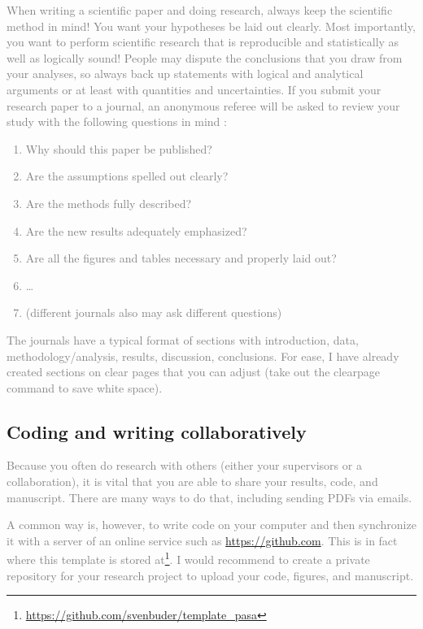 \documentclass[
  journal=pasa,
  manuscript=Research-Article,
  year=2025,
  volume=X,
]{cup-journal}
\newcommand{\comment}[1]{\textcolor{gray}{#1}}
\begin{document}
\comment{When writing a scientific paper and doing research, always keep the scientific method in mind! You want your hypotheses be laid out clearly. Most importantly, you want to perform scientific research that is reproducible and statistically as well as logically sound! People may dispute the conclusions that you draw from your analyses, so always back up statements with logical and analytical arguments or at least with quantities and uncertainties. If you submit your research paper to a journal, an anonymous referee will be asked to review your study with the following questions in mind \citep{Bertout2004}:
\begin{enumerate}
    \item Why should this paper be published?
    \item Are the assumptions spelled out clearly?
    \item Are the methods fully described?
    \item Are the new results adequately emphasized?
    \item Are all the figures and tables necessary and properly laid out?
    \item \dots
    \item (different journals also may ask different questions)
\end{enumerate}}

\comment{The journals have a typical format of sections with introduction, data, methodology/analysis, results, discussion, conclusions. For ease, I have already created sections on clear pages that you can adjust (take out the clearpage command to save white space).}

\subsection{Coding and writing collaboratively}

\comment{Because you often do research with others (either your supervisors or a collaboration), it is vital that you are able to share your results, code, and manuscript. There are many ways to do that, including sending PDFs via emails.}

\comment{A common way is, however, to write code on your computer and then synchronize it with a server of an online service such as \url{https://github.com}. This is in fact where this template is stored at\footnote{\url{https://github.com/svenbuder/template_pasa}}. I would recommend to create a private repository for your research project to upload your code, figures, and manuscript.}
\end{document}
